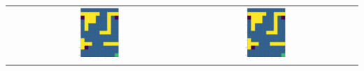 \begin{center}
\begin{tabular}{c | c  c  c}
        & 
            \includegraphics[width=0.26\textwidth]{assets/dp/analysis/prob_0.25_gamma_0.8_policy.png}
        &
            \includegraphics[width=0.26\textwidth]{assets/dp/analysis/prob_0.5_gamma_0.8_policy.png}
    \end{tabular}        
\end{center}


